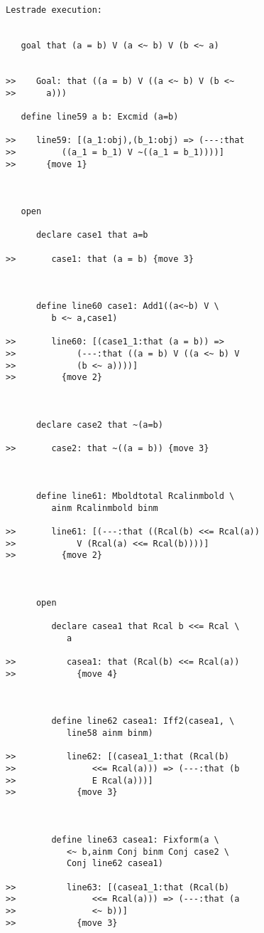 \documentclass[12pt]{article}
\begin{document}
\begin{verbatim}Lestrade execution:


   goal that (a = b) V (a <~ b) V (b <~ a)


>>    Goal: that ((a = b) V ((a <~ b) V (b <~
>>      a)))

   define line59 a b: Excmid (a=b)

>>    line59: [(a_1:obj),(b_1:obj) => (---:that
>>         ((a_1 = b_1) V ~((a_1 = b_1))))]
>>      {move 1}



   open

      declare case1 that a=b

>>       case1: that (a = b) {move 3}



      define line60 case1: Add1((a<~b) V \
         b <~ a,case1)

>>       line60: [(case1_1:that (a = b)) =>
>>            (---:that ((a = b) V ((a <~ b) V
>>            (b <~ a))))]
>>         {move 2}



      declare case2 that ~(a=b)

>>       case2: that ~((a = b)) {move 3}



      define line61: Mboldtotal Rcalinmbold \
         ainm Rcalinmbold binm

>>       line61: [(---:that ((Rcal(b) <<= Rcal(a))
>>            V (Rcal(a) <<= Rcal(b))))]
>>         {move 2}



      open

         declare casea1 that Rcal b <<= Rcal \
            a

>>          casea1: that (Rcal(b) <<= Rcal(a))
>>            {move 4}



         define line62 casea1: Iff2(casea1, \
            line58 ainm binm)

>>          line62: [(casea1_1:that (Rcal(b)
>>               <<= Rcal(a))) => (---:that (b
>>               E Rcal(a)))]
>>            {move 3}



         define line63 casea1: Fixform(a \
            <~ b,ainm Conj binm Conj case2 \
            Conj line62 casea1)

>>          line63: [(casea1_1:that (Rcal(b)
>>               <<= Rcal(a))) => (---:that (a
>>               <~ b))]
>>            {move 3}




\end{verbatim}
\end{document}

